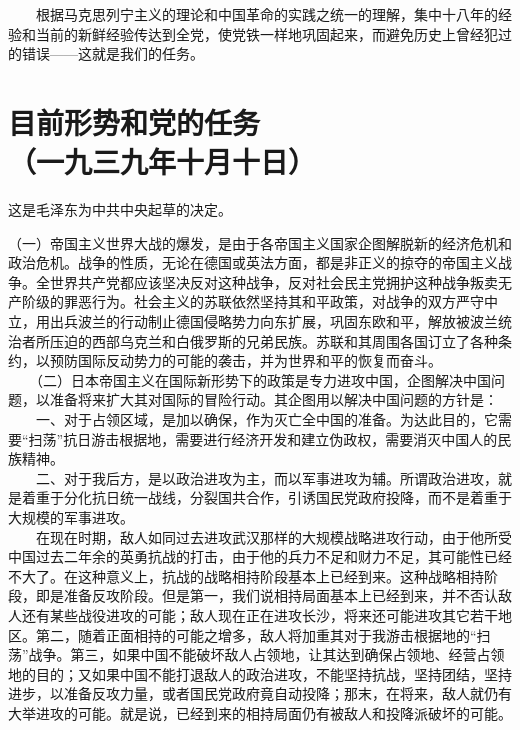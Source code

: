 \documentclass[cn,11pt,chinese]{elegantbook}
\def\myformat#1{\hfil\hfil #1}
\begin{document}
　　根据马克思列宁主义的理论和中国革命的实践之统一的理解，集中十八年的经验和当前的新鲜经验传达到全党，使党铁一样地巩固起来，而避免历史上曾经犯过的错误——这就是我们的任务。\\
\newpage\section*{\myformat{目前形势和党的任务}\\\myformat{（一九三九年十月十日）}}
\begin{introduction}\item  这是毛泽东为中共中央起草的决定。\end{introduction}
（一）帝国主义世界大战的爆发，是由于各帝国主义国家企图解脱新的经济危机和政治危机。战争的性质，无论在德国或英法方面，都是非正义的掠夺的帝国主义战争。全世界共产党都应该坚决反对这种战争，反对社会民主党拥护这种战争叛卖无产阶级的罪恶行为。社会主义的苏联依然坚持其和平政策，对战争的双方严守中立，用出兵波兰的行动制止德国侵略势力向东扩展，巩固东欧和平，解放被波兰统治者所压迫的西部乌克兰和白俄罗斯的兄弟民族。苏联和其周围各国订立了各种条约，以预防国际反动势力的可能的袭击，并为世界和平的恢复而奋斗。\\
　　（二）日本帝国主义在国际新形势下的政策是专力进攻中国，企图解决中国问题，以准备将来扩大其对国际的冒险行动。其企图用以解决中国问题的方针是：\\
　　一、对于占领区域，是加以确保，作为灭亡全中国的准备。为达此目的，它需要“扫荡”抗日游击根据地，需要进行经济开发和建立伪政权，需要消灭中国人的民族精神。\\
　　二、对于我后方，是以政治进攻为主，而以军事进攻为辅。所谓政治进攻，就是着重于分化抗日统一战线，分裂国共合作，引诱国民党政府投降，而不是着重于大规模的军事进攻。\\
　　在现在时期，敌人如同过去进攻武汉那样的大规模战略进攻行动，由于他所受中国过去二年余的英勇抗战的打击，由于他的兵力不足和财力不足，其可能性已经不大了。在这种意义上，抗战的战略相持阶段基本上已经到来。这种战略相持阶段，即是准备反攻阶段。但是第一，我们说相持局面基本上已经到来，并不否认敌人还有某些战役进攻的可能；敌人现在正在进攻长沙，将来还可能进攻其它若干地区。第二，随着正面相持的可能之增多，敌人将加重其对于我游击根据地的“扫荡”战争。第三，如果中国不能破坏敌人占领地，让其达到确保占领地、经营占领地的目的；又如果中国不能打退敌人的政治进攻，不能坚持抗战，坚持团结，坚持进步，以准备反攻力量，或者国民党政府竟自动投降；那末，在将来，敌人就仍有大举进攻的可能。就是说，已经到来的相持局面仍有被敌人和投降派破坏的可能。\\
\end{document}
